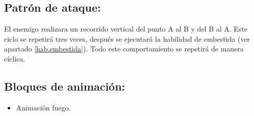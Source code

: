 \subsection{Patrón de ataque:}
El enemigo realizara un recorrido vertical del punto A al B y del B al A. Este ciclo se repetirá tres veces, después se ejecutará la habilidad de embestida (ver apartado \ref{hab.embestida}). Todo este comportamiento se repetirá de manera cíclica.
\subsection{Bloques de animación:}
	\begin{itemize}
		\item Animación fuego.
	\end{itemize}